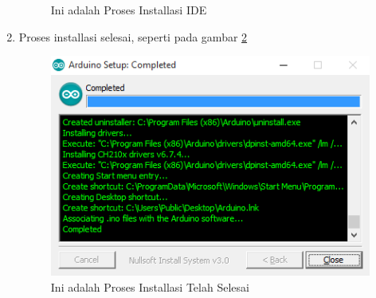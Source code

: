 \begin{enumerate}
\begin{figure}[!htbp]
            \caption{Ini adalah Proses Installasi IDE}\label{fig:installing}
            \end{figure}
        \item Proses installasi selesai, seperti pada gambar \ref{fig:complete}
            \begin{figure}[!htbp]
            \centering
            \includegraphics[width=.75\textwidth]{figures/IDE/complete.png}
            \caption{Ini adalah Proses Installasi Telah Selesai}\label{fig:complete}
            \end{figure}
        \end{enumerate}